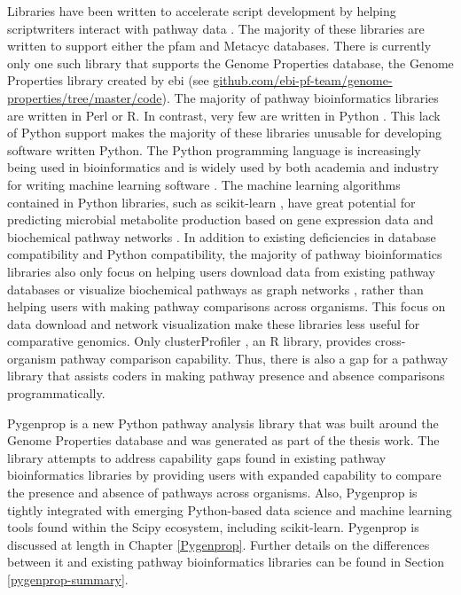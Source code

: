 Libraries have been written to accelerate script development by helping 
scriptwriters interact with pathway data 
\cite{zhang2009kegggraph,posma2013metabonetworks,yu2012clusterprofiler,cock2009biopython,international}. 
The majority of these libraries are written to support either the \gls{pfam} 
\cite{zhang2009kegggraph,posma2013metabonetworks,yu2012clusterprofiler,cock2009biopython} 
and Metacyc \cite{international} databases. There is currently only one such 
library that supports the Genome Properties database, the Genome Properties 
library created by \gls{ebi} (see 
\href{https://github.com/ebi-pf-team/genome-properties/tree/master/code}{github.com/ebi-pf-team/genome-properties/tree/master/code}). 
The majority of pathway bioinformatics libraries are written in Perl 
\cite{wall1994perl} or R. In contrast, very few are written in Python  
\cite{zhang2009kegggraph,posma2013metabonetworks,yu2012clusterprofiler,cock2009biopython,international}. 
This lack of Python support makes the majority of these libraries unusable for 
developing software written Python. The Python programming language is 
increasingly being used in bioinformatics and is widely used by both academia 
and industry for writing machine learning software 
\cite{antao2018bioinformatics,muller2016introduction}. The machine learning 
algorithms contained in Python libraries, such as \gls{scikit}-learn 
\cite{pedregosa2011scikit}, have great potential for predicting microbial 
metabolite production based on gene expression data and biochemical pathway 
networks \cite{costello2018machine,cuperlovic2018machine}. In addition to 
existing deficiencies in database compatibility and Python compatibility, the 
majority of pathway bioinformatics libraries also only focus on helping users 
download data from existing pathway databases \cite{tenenbaum2019keggrest, 
cock2009biopython} or visualize biochemical pathways as graph networks 
\cite{posma2013metabonetworks}, rather than helping users with making pathway 
comparisons across organisms. This focus on data download and network 
visualization make these libraries less useful for comparative genomics. Only 
clusterProfiler \cite{yu2012clusterprofiler}, an R library, provides 
cross-organism pathway comparison capability. Thus, there is also a gap for a 
pathway library that assists coders in making pathway presence and absence 
comparisons programmatically. 

Pygenprop is a new Python pathway analysis library that was built around the 
Genome Properties database and was generated as part of the thesis work. The 
library attempts to address capability gaps found in existing pathway 
bioinformatics libraries by providing users with expanded capability to compare 
the presence and absence of pathways across organisms. Also, Pygenprop is 
tightly integrated with emerging Python-based data science and machine 
learning tools found within the Scipy \cite{scipystack} ecosystem, including 
\gls{scikit}-learn. Pygenprop is discussed at length in Chapter \ref{Pygenprop}. 
Further details on the differences between it and existing pathway 
bioinformatics libraries can be found in Section \ref{pygenprop-summary}.

